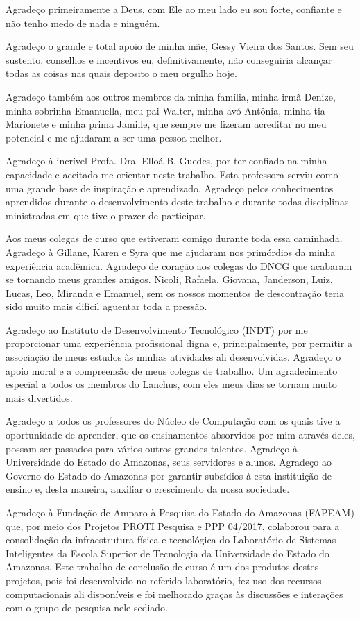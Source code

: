 Agradeço primeiramente a Deus, com Ele ao meu lado eu sou forte, confiante e não tenho medo de nada e ninguém.

Agradeço o grande e total apoio de minha mãe, Gessy Vieira dos Santos. Sem seu sustento, conselhos e incentivos eu, definitivamente, não conseguiria alcançar todas as coisas nas quais deposito o meu orgulho hoje.

Agradeço também aos outros membros da minha família, minha irmã Denize, minha sobrinha Emanuella, meu pai Walter, minha avó Antônia, minha tia Marionete e minha prima Jamille, que sempre me fizeram acreditar no meu potencial e me ajudaram a ser uma pessoa melhor.

Agradeço à incrível Profa. Dra. Elloá B. Guedes, por ter confiado na minha capacidade e aceitado me orientar neste trabalho. Esta professora serviu como uma grande base de inspiração e aprendizado. Agradeço pelos conhecimentos aprendidos durante o desenvolvimento deste trabalho e  durante todas disciplinas ministradas em que tive o prazer de participar.

Aos meus colegas de curso que estiveram comigo durante toda essa caminhada. Agradeço à Gillane, Karen e Syra que me ajudaram nos primórdios da minha experiência acadêmica. Agradeço de coração aos colegas do DNCG que acabaram se tornando meus grandes amigos. Nicoli, Rafaela, Giovana, Janderson, Luiz, Lucas, Leo, Miranda e Emanuel, sem os nossos momentos de descontração teria sido muito mais difícil aguentar toda a pressão.

Agradeço ao Instituto de Desenvolvimento Tecnológico (INDT) por me proporcionar uma experiência profissional digna e, principalmente, por permitir a associação de meus estudos às minhas atividades ali desenvolvidas. Agradeço o apoio moral e a compreensão de meus colegas de trabalho. Um agradecimento especial a todos os membros do Lanchus, com eles meus dias se tornam muito mais divertidos.

Agradeço a todos os professores do Núcleo de Computação com os quais tive a oportunidade de aprender, que os ensinamentos absorvidos por mim através deles, possam ser passados para vários outros grandes talentos. Agradeço à Universidade do Estado do Amazonas, seus servidores e alunos. Agradeço ao Governo do Estado do Amazonas por garantir subsídios à esta instituição de ensino e, desta maneira, auxiliar o crescimento da nossa sociedade.

Agradeço à Fundação de Amparo à Pesquisa do Estado do Amazonas (FAPEAM) que, por meio dos Projetos PROTI Pesquisa e PPP 04/2017, colaborou para a consolidação da infraestrutura física e tecnológica do Laboratório de Sistemas Inteligentes da Escola Superior de Tecnologia da Universidade do Estado do Amazonas. Este trabalho de conclusão de curso é um dos produtos destes projetos, pois foi desenvolvido no referido laboratório, fez uso dos recursos computacionais ali disponíveis e foi melhorado graças às discussões e interações com o grupo de pesquisa nele sediado.
